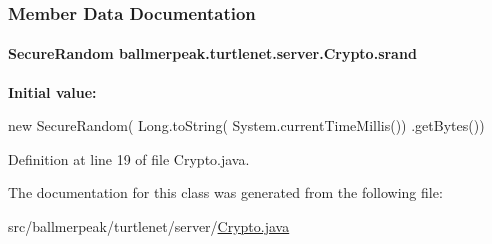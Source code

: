 \subsubsection{Member Data Documentation}
\hypertarget{classballmerpeak_1_1turtlenet_1_1server_1_1Crypto_ad2ae6688f871ae46b7a5ae98b35d7000}{
\paragraph[{srand}]{\setlength{\rightskip}{0pt plus 5cm}Secure\-Random ballmerpeak.\-turtlenet.\-server.\-Crypto.\-srand\hspace{0.3cm}{\ttfamily [static]}}}\label{classballmerpeak_1_1turtlenet_1_1server_1_1Crypto_ad2ae6688f871ae46b7a5ae98b35d7000}
{\bfseries Initial value\-:}
\begin{DoxyCode}
 \textcolor{keyword}{new} SecureRandom(
                                               Long.toString(
                                                   System.currentTimeMillis())
                                               .getBytes())
\end{DoxyCode}


Definition at line 19 of file Crypto.\-java.



The documentation for this class was generated from the following file\-:\begin{DoxyCompactItemize}
\item 
src/ballmerpeak/turtlenet/server/\hyperlink{Crypto_8java}{Crypto.\-java}\end{DoxyCompactItemize}
